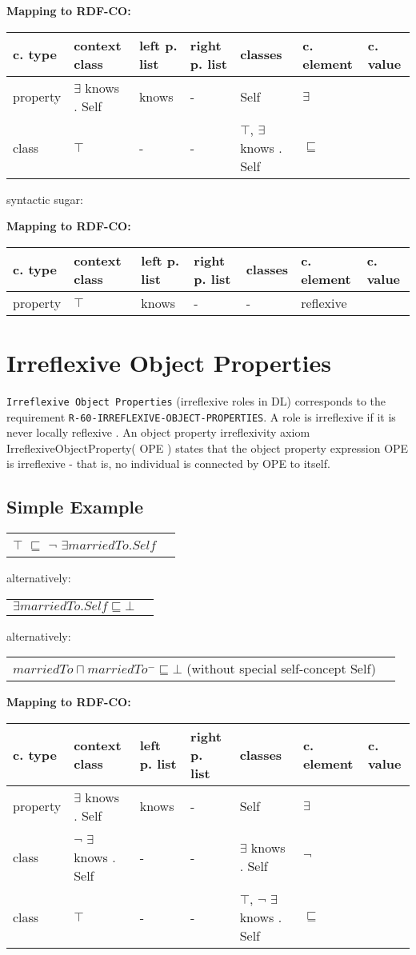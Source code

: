 \documentclass{llncs}
\newcommand{\ms}[1]{\texttt{#1}}
\newenvironment{gcotable}{
  \scriptsize
  \sffamily
  \vspace{0cm}
	\begin{center}
	\textbf{\vspace{0.4cm}Mapping to RDF-CO:} \\
  \begin{tabular}{l|l|l|l|l|l|l}
	\hline
  \textbf{c. type} & \textbf{context class} & \textbf{left p. list} & \textbf{right p. list} & \textbf{classes} & \textbf{c. element} & \textbf{c. value} \\
  \hline

}{
  \hline
  \end{tabular}
	\end{center}
}
\newenvironment{DL}{
  \vspace{0cm}
	\begin{center}
  \begin{tabular}{r l}

}{
  \end{tabular}
	\end{center}
}
\begin{document}
\begin{gcotable}
property & $\exists$ knows . Self & knows & - & Self & $\exists$ \\
class & $\top$ & - & - & $\top$, $\exists$ knows . Self & $\sqsubseteq$ \\
\end{gcotable}

syntactic sugar:

\begin{gcotable}
property & $\top$ & knows & - & - & reflexive \\
\end{gcotable}

\section{Irreflexive Object Properties}

\ms{Irreflexive Object Properties} (irreflexive roles in DL) corresponds to the requirement \ms{R-60-IRREFLEXIVE-OBJECT-PROPERTIES}.
A role is irreflexive if it is never locally reflexive \cite{Kroetzsch2012}.
An object property irreflexivity axiom IrreflexiveObjectProperty( OPE ) states that the object property expression OPE is irreflexive - that is, no individual is connected by OPE to itself. 

\subsection{Simple Example}

\begin{DL}
$\top$ $\sqsubseteq$ $\neg$ $\exists  marriedTo . Self$ 
\end{DL}

alternatively:

\begin{DL}
$\exists marriedTo . Self \sqsubseteq \bot$  
\end{DL}

alternatively:

\begin{DL}
$marriedTo \sqcap marriedTo^{-} \sqsubseteq \bot$ (without special self-concept Self)
\end{DL}

\begin{gcotable}
property & $\exists$ knows . Self & knows & - & Self & $\exists$ \\
class & $\neg$ $\exists$ knows . Self & - & - & $\exists$ knows . Self & $\neg$ \\
class & $\top$ & - & - & $\top$, $\neg$ $\exists$ knows . Self & $\sqsubseteq$ \\
\end{gcotable}
\end{document}
